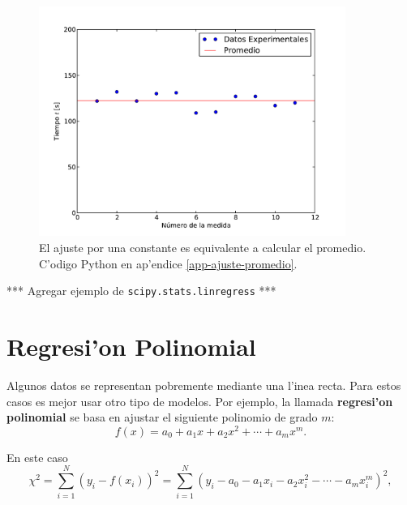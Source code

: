 \documentclass[letterpaper,11pt]{report}
\begin{document}
\begin{figure}[h!]
\begin{center}
\includegraphics[width=10cm]{figs/fig-ajuste-promedio.pdf}
\caption{El ajuste por una constante es equivalente a calcular el promedio. C'odigo Python en ap'endice \ref{app-ajuste-promedio}.}
\end{center}
\end{figure}

*** Agregar ejemplo de \texttt{scipy.stats.linregress} ***

\section{Regresi'on Polinomial}

Algunos datos se representan pobremente mediante una l'inea recta. Para estos casos es mejor usar otro tipo de modelos. Por ejemplo, la llamada \textbf{regresi'on polinomial} se basa en ajustar el siguiente polinomio de grado $m$:
\begin{equation}
f(x) = a_0+a_1x+a_2x^2+\cdots + a_mx^m.
\end{equation}

En este caso
\begin{equation}\label{Srpol}
\chi^2 = \sum_{i=1}^N\left(y_i-f(x_i)\right)^2=\sum_{i=1}^N\left(y_i-a_0-a_1x_i-a_2x_i^2-\cdots - a_mx_i^m\right)^2,
\end{equation}
\end{document}
